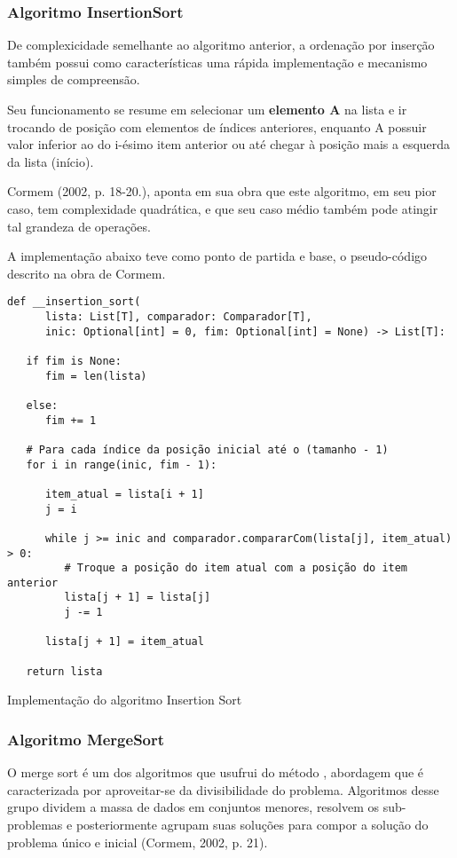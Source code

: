 \documentclass[a4paper,12pt]{scrartcl}
\begin{document}
\subsubsection{Algoritmo InsertionSort}
De complexicidade semelhante ao algoritmo anterior, a ordenação por inserção também possui como características uma rápida implementação e mecanismo simples de compreensão.

Seu funcionamento se resume em selecionar um \textbf{elemento A} na lista e ir trocando de posição com elementos de índices anteriores, enquanto A possuir valor inferior ao do i-ésimo item anterior ou até chegar à posição mais a esquerda da lista (início).

Cormem\cite{cormem} (2002, p. 18-20.), aponta em sua obra que este algoritmo, em seu pior caso, tem complexidade quadrática, e que seu caso médio também pode atingir tal grandeza de operações.

A implementação abaixo teve como ponto de partida e base, o pseudo-código descrito na obra de Cormem.

\begin{listing}[H]
\begin{verbatim}
def __insertion_sort(
      lista: List[T], comparador: Comparador[T],
      inic: Optional[int] = 0, fim: Optional[int] = None) -> List[T]:

   if fim is None:
      fim = len(lista)

   else:
      fim += 1

   # Para cada índice da posição inicial até o (tamanho - 1)
   for i in range(inic, fim - 1):

      item_atual = lista[i + 1]
      j = i

      while j >= inic and comparador.compararCom(lista[j], item_atual) > 0:
         # Troque a posição do item atual com a posição do item anterior
         lista[j + 1] = lista[j]
         j -= 1

      lista[j + 1] = item_atual

   return lista
\end{verbatim}
\caption{\footnotesize{Implementação do algoritmo Insertion Sort}}
\end{listing}

\subsubsection{Algoritmo MergeSort}
O merge sort é um dos algoritmos que usufrui do método , abordagem que é caracterizada por aproveitar-se da divisibilidade do problema. Algoritmos desse grupo dividem a massa de dados em conjuntos menores, resolvem os sub-problemas e posteriormente agrupam suas soluções para compor a solução do problema único e inicial (Cormem\cite{cormem}, 2002, p. 21).
\end{document}
